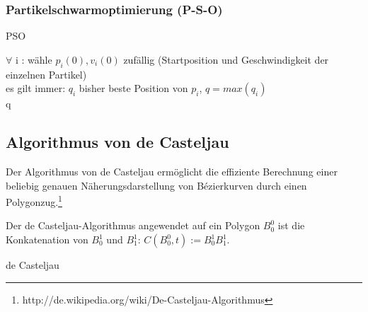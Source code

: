 \subsubsection{Partikelschwarmoptimierung (P-S-O)}
\begin{algorithm}[H]
	\caption{PSO}
        
        
        $\forall$ i : wähle $p_i(0), v_i(0)$ zufällig (Startposition und Geschwindigkeit der einzelnen Partikel)\\
        
        es gilt immer: $q_i$ bisher beste Position von $p_i$, $q = max(q_i)$\\
        \Return q\\
\end{algorithm}

\subsection{Algorithmus von de Casteljau}
Der Algorithmus von de Casteljau ermöglicht die effiziente Berechnung einer beliebig genauen Näherungsdarstellung von Bézierkurven durch einen Polygonzug.\footnote{http://de.wikipedia.org/wiki/De-Casteljau-Algorithmus}

Der de Casteljau-Algorithmus angewendet auf ein Polygon \(B_0^0\) ist die Konkatenation von \(B_0^1\) und \(B_1^1\): \(C(B_0^0,t) := B_0^1 B_1^1\).

\begin{algorithm}[H]
	\caption{de Casteljau}

	\BlankLine

\end{algorithm}

